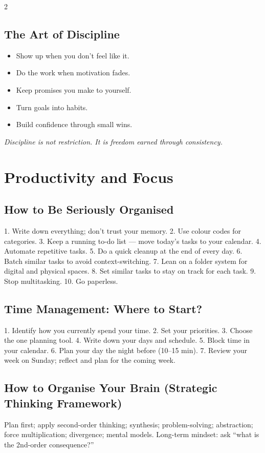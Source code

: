 \documentclass[10pt,a4paper]{article}
\begin{document}
\begin{multicols}{2}
\subsection{The Art of Discipline}
\begin{itemize}
\item Show up when you don't feel like it.
\item Do the work when motivation fades.
\item Keep promises you make to yourself.
\item Turn goals into habits.
\item Build confidence through small wins.
\end{itemize}
\textit{Discipline is not restriction. It is freedom earned through consistency.}

\section{Productivity and Focus}

\subsection{How to Be Seriously Organised}
1. Write down everything; don't trust your memory. 2. Use colour codes for categories. 3. Keep a running to-do list --- move today's tasks to your calendar. 4. Automate repetitive tasks. 5. Do a quick cleanup at the end of every day. 6. Batch similar tasks to avoid context-switching. 7. Lean on a folder system for digital and physical spaces. 8. Set similar tasks to stay on track for each task. 9. Stop multitasking. 10. Go paperless.

\subsection{Time Management: Where to Start?}
1. Identify how you currently spend your time.
2. Set your priorities.
3. Choose the one planning tool.
4. Write down your days and schedule.
5. Block time in your calendar.
6. Plan your day the night before (10--15 min).
7. Review your week on Sunday; reflect and plan for the coming week.

\subsection{How to Organise Your Brain (Strategic Thinking Framework)}
Plan first; apply second-order thinking; synthesis; problem-solving; abstraction; force multiplication; divergence; mental models. Long-term mindset: ask ``what is the 2nd-order consequence?''


\end{multicols}
\end{document}
